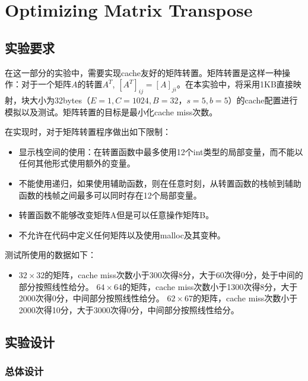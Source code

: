 \chapter{Optimizing Matrix Transpose}
\label{cha:optimizing_matrix_transpose}

\section{实验要求}
\label{sec2:shi_yan_yao_qiu_}

\par 在这一部分的实验中，需要实现cache友好的矩阵转置。矩阵转置是这样一种操作：对于一个矩阵$A$的转置$A^{T}$, $[A^{T}]_{ij} = [A]_{ji}$。在本实验中，将采用1KB直接映射，块大小为32bytes（$E=1, C=1024, B=32$，$s=5, b=5$）的cache配置进行模拟以及测试。矩阵转置的目标是最小化cache miss次数。

\par 在实现时，对于矩阵转置程序做出如下限制：
\begin{itemize}
    \item 显示栈空间的使用：在转置函数中最多使用12个int类型的局部变量，而不能以任何其他形式使用额外的变量。
    \item 不能使用递归，如果使用辅助函数，则在任意时刻，从转置函数的栈帧到辅助函数的栈帧之间最多可以同时存在12个局部变量。
    \item 转置函数不能够改变矩阵A但是可以任意操作矩阵B。
    \item 不允许在代码中定义任何矩阵以及使用malloc及其变种。
\end{itemize}

\par 测试所使用的数据如下：
\begin{itemize}
    \item $32\times 32$的矩阵，cache miss次数小于300次得8分，大于60次得0分，处于中间的部分按照线性给分。
        $64\times 64$的矩阵，cache miss次数小于1300次得8分，大于2000次得0分，中间部分按照线性给分。
        $62\times 67$的矩阵，cache miss次数小于2000次得10分，大于3000次得0分，中间部分按照线性给分。
\end{itemize}

\section{实验设计}
\label{sec2:shi_yan_she_ji_}

\subsection{总体设计}
\label{sub2:zong_ti_she_ji_}

